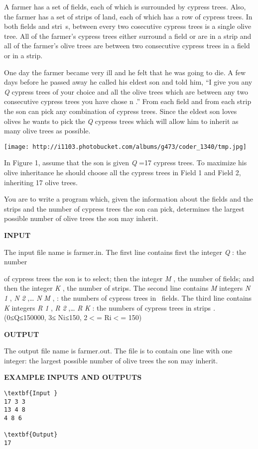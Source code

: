 

A farmer has a set of fields, each of which is surrounded by cypress trees. Also, the farmer has a set of strips of land, each of which has a row of cypress trees. In both fields and stri s, between every two cosecutive cypress trees is a single olive tree. All of the farmer’s cypress trees either surround a field or are in a strip and all of the farmer’s olive trees are between two consecutive cypress trees in a field or in a strip.

One day the farmer became very ill and he felt that he was going to die. A few days before he passed away he called his eldest son and told him, “I give you any \emph{ Q } cypress trees of your choice and all the olive trees which are between any two consecutive cypress trees you have chose n .” From each field and from each strip the son can pick any combination of cypress trees. Since the eldest son loves olives he wants to pick the \emph{ Q } cypress trees which will allow him to inherit as many olive trees as possible.


\texttt{[image: http://i1103.photobucket.com/albums/g473/coder\_1340/tmp.jpg]}

In Figure 1, assume that the son is given \emph{ Q } =17 cypress trees. To maximize his olive inheritance he should choose all the cypress trees in Field 1 and Field 2, inheriting 17 olive trees.

You are to write a program which, given the information about the fields and the strips and the number of cypress trees the son can pick, determines the largest possible number of olive trees the son may inherit.

\textbf{INPUT }

The input file name is farmer.in. The first line contains first the integer \emph{ Q } : the number

of cypress trees the son is to select; then the integer \emph{ M } , the number of fields; and then the integer \emph{ K } , the number of strips. The second line contains \emph{ M } integers \emph{ N }\emph{ 1 } , \emph{ N }\emph{ 2 } ,… \emph{ N }\emph{ M } , : the numbers of cypress trees in  fields. The third line contains \emph{ K } integers \emph{ R }\emph{ 1 } , \emph{ R }\emph{ 2 } ,… \emph{ R }\emph{ K } : the numbers of cypress trees in strips \emph{ . } (0≤Q≤150000, 3≤ Ni≤150, 2$<$= Ri$<$= 150)

\textbf{OUTPUT }

The output file name is farmer.out. The file is to contain one line with one integer: the largest possible number of olive trees the son may inherit.

\textbf{EXAMPLE INPUTS AND OUTPUTS }
\begin{verbatim}
\textbf{Input }
17 3 3
13 4 8
4 8 6

\textbf{Output}
17\end{verbatim}